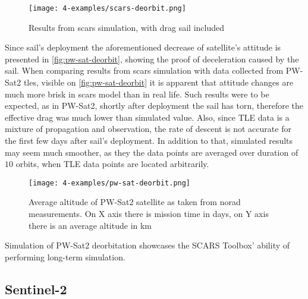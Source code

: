             \begin{figure}[H]
                \centering
                \texttt{[image: 4-examples/scars-deorbit.png]}
                \caption{Results from \ac{scars} simulation, with drag sail included}
                \label{fig:scars-deorbit}
            \end{figure}

            Since sail's deployment the aforementioned decrease of satellite's attitude is presented in \autoref{fig:pw-sat-deorbit}, showing the proof of deceleration caused by the sail. When comparing results from \ac{scars} simulation with data collected from PW-Sat2 \ac{tle}s, visible on \autoref{fig:pw-sat-deorbit} it is apparent that attitude changes are much more brisk in \ac{scars} model than in real life. Such results were to be expected, as in PW-Sat2, shortly after deployment the sail has torn, therefore the effective drag was much lower than simulated value\cite{space24_pwsat}. Also, since TLE data is a mixture of propagation and observation, the rate of descent is not accurate for the first few days after sail's deployment. In addition to that, simulated results may seem much smoother, as they the data points are averaged over duration of $10$ orbits, when TLE data points are located arbitrarily.
            
            \begin{figure}[H]
                \centering
                \texttt{[image: 4-examples/pw-sat-deorbit.png]}
                \caption{Average altitude of PW-Sat2 satellite as taken from \ac{norad} measurements. On X axis there is mission time in days, on Y axis there is an average altitude in km\cite{pw_sat2_deorbit}}
                \label{fig:pw-sat-deorbit}
            \end{figure}

            Simulation of PW-Sat2 deorbitation showcases the SCARS Toolbox' ability of performing long-term simulation.









    \subsection{Sentinel-2}\label{sec:sentinel}
    
